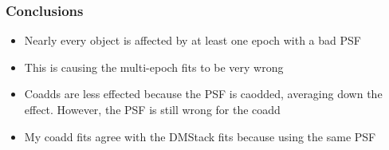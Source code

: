 \documentclass{beamer}
\begin{document}
\frame
{
    \frametitle{Conclusions}

 
    \begin{itemize}

        \item Nearly every object is affected by at least one epoch
            with a bad PSF

        \item This is causing the multi-epoch fits to be very wrong

        \item Coadds are less effected because the PSF is caodded,
            averaging down the effect.  However, the PSF is still
            wrong for the coadd

        \item My coadd fits agree with the DMStack fits because using
            the same PSF

    \end{itemize}

}
\end{document}
